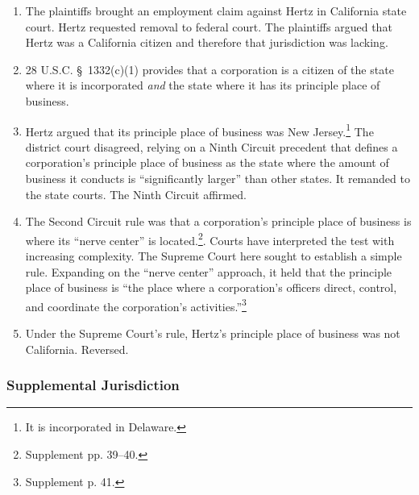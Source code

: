 \begin{enumerate}
    \item The plaintiffs brought an employment claim against Hertz in California state court. Hertz requested removal to federal court. The plaintiffs argued that Hertz was a California citizen and therefore that jurisdiction was lacking.
    \item 28 U.S.C. \S\ 1332(c)(1) provides that a corporation is a citizen of the state where it is incorporated \emph{and} the state where it has its principle place of business.
    \item Hertz argued that its principle place of business was New Jersey.\footnote{It is incorporated in Delaware.} The district court disagreed, relying on a Ninth Circuit precedent that defines a corporation's principle place of business as the state where the amount of business it conducts is ``significantly larger'' than other states. It remanded to the state courts. The Ninth Circuit affirmed.
    \item The Second Circuit rule was that a corporation's principle place of business is where its ``nerve center'' is located.\footnote{Supplement pp. 39--40.}. Courts have interpreted the test with increasing complexity. The Supreme Court here sought to establish a simple rule. Expanding on the ``nerve center'' approach, it held that the principle place of business is ``the place where a corporation's officers direct, control, and coordinate the corporation's activities.''\footnote{Supplement p. 41.}
    \item Under the Supreme Court's rule, Hertz's principle place of business was not California. Reversed.
\end{enumerate}

\subsubsection{Supplemental Jurisdiction}

